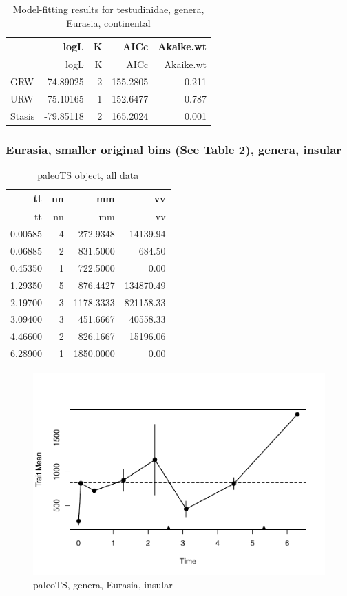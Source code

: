 \documentclass[]{article}
\begin{document}
\begin{longtable}[]{@{}lrrrr@{}}
\caption{Model-fitting results for testudinidae, genera, Eurasia,
continental}\tabularnewline
\toprule
& logL & K & AICc & Akaike.wt\tabularnewline
\midrule
\endfirsthead
\toprule
& logL & K & AICc & Akaike.wt\tabularnewline
\midrule
\endhead
GRW & -74.89025 & 2 & 155.2805 & 0.211\tabularnewline
URW & -75.10165 & 1 & 152.6477 & 0.787\tabularnewline
Stasis & -79.85118 & 2 & 165.2024 & 0.001\tabularnewline
\bottomrule
\end{longtable}

\newpage 

\subsubsection{Eurasia, smaller original bins (See Table 2), genera,
insular}\label{eurasia-smaller-original-bins-see-table-2-genera-insular}

\begin{longtable}[]{@{}rrrr@{}}
\caption{paleoTS object, all data}\tabularnewline
\toprule
tt & nn & mm & vv\tabularnewline
\midrule
\endfirsthead
\toprule
tt & nn & mm & vv\tabularnewline
\midrule
\endhead
0.00585 & 4 & 272.9348 & 14139.94\tabularnewline
0.06885 & 2 & 831.5000 & 684.50\tabularnewline
0.45350 & 1 & 722.5000 & 0.00\tabularnewline
1.29350 & 5 & 876.4427 & 134870.49\tabularnewline
2.19700 & 3 & 1178.3333 & 821158.33\tabularnewline
3.09400 & 3 & 451.6667 & 40558.33\tabularnewline
4.46600 & 2 & 826.1667 & 15196.06\tabularnewline
6.28900 & 1 & 1850.0000 & 0.00\tabularnewline
\bottomrule
\end{longtable}

\begin{figure}[htbp]
\centering
\includegraphics{MA_JJ_files/figure-latex/pTSEsI-1.pdf}
\caption{paleoTS, genera, Eurasia, insular}
\end{figure}
\end{document}
